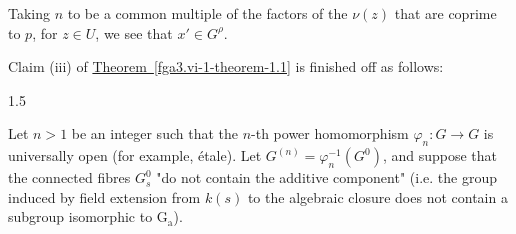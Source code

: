   Taking \(n\) to be a common multiple of the factors of the \(\nu (z)\) that are coprime to \(p\), for \(z\in  U\), we see that \(x'\in  G^\rho \).\par{}Claim (iii) of \hyperref[fga3.vi-1-theorem-1.1]{Theorem~\ref*{fga3.vi-1-theorem-1.1}} is finished off as follows:\begin{corollary}{1.5}\label{fga3.vi-1-corollary-1.5}\skipsinglepar\par{}Let \(n>1\) be an integer such that the \(n\)-th power homomorphism \(\varphi _n\colon  G\to  G\) is universally open (for example, étale).
    Let \(G^{(n)}=\varphi _n^{-1}(G^0)\), and suppose that the connected fibres \(G_s^0\) "do not contain the additive component" (i.e. the group induced by field extension from \(k(s)\) to the algebraic closure does not contain a subgroup isomorphic to \(\operatorname {G_a}\)).
    

\end{corollary}
